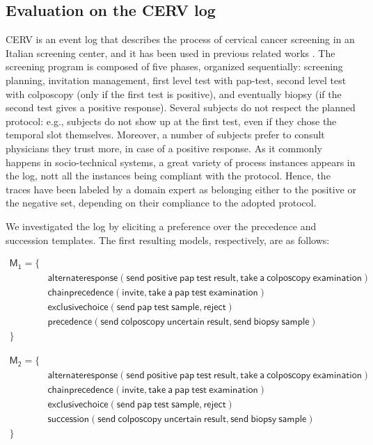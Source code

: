 \subsection{Evaluation on the CERV log}
\label{subsec:cerv}

CERV is an event log that describes the process of cervical cancer screening in an Italian screening center, and it has been used in previous related works \cite{2007b-Lamma,deviant-tkde}. The screening program is composed of five phases, organized sequentially: screening planning, invitation management, first level test with pap-test, second level test with colposcopy (only if the first test is positive), and eventually biopsy (if the second test gives a positive response). Several subjects do not respect the planned protocol: e.g., subjects do not show up at the first test, even if they chose the temporal slot themselves. Moreover, a number of subjects prefer to consult physicians they trust more, in case of a positive response. As it commonly happens in socio-technical systems, a great variety of process instances appears in the log, nott all the instances being compliant with the protocol.
%
Hence, the traces have been labeled by a domain expert as belonging either to the positive or the negative set, depending on their compliance to the adopted protocol.

We investigated the log by eliciting a preference over the \textsf{precedence} and \textsf{succession} templates. The first resulting models, respectively, are as follows:

\begin{align*}
\mathsf{M_1} = \{ & \\
& \mathsf{ alternateresponse(send\ positive\ pap\ test\ result, take\ a\ colposcopy\ examination)} \\
& \mathsf{ chainprecedence(invite, take\ a\ pap\ test\ examination)} \\
& \mathsf{ exclusivechoice(send\ pap\ test\ sample, reject)} \\
& \mathsf{precedence(send\ colposcopy\ uncertain\ result, send\ biopsy\ sample)} \\
\} & 
\end{align*}

\begin{align*}
\mathsf{M_2} = \{ & \\
& \mathsf{ alternateresponse(send\ positive\ pap\ test\ result, take\ a\ colposcopy\ examination)} \\
& \mathsf{ chainprecedence(invite, take\ a\ pap\ test\ examination)} \\
& \mathsf{ exclusivechoice(send\ pap\ test\ sample, reject)} \\
& \mathsf{succession(send\ colposcopy\ uncertain\ result, send\ biopsy\ sample)} \\
\} & 
\end{align*}

